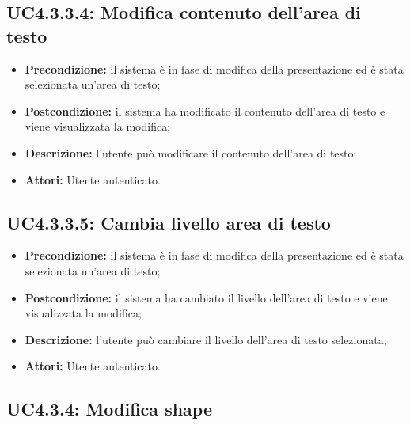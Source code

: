 \subsection{ UC4.3.3.4: Modifica contenuto dell'area di testo}

\begin{itemize}
	\item \textbf{Precondizione:} il sistema è in fase di modifica della presentazione ed è stata selezionata un'area di testo;
	\item \textbf{Postcondizione:} il sistema ha modificato il contenuto dell'area di testo e viene visualizzata la modifica;
	\item \textbf{Descrizione:} l'utente può modificare il contenuto dell'area di testo;
	\item \textbf{Attori:} Utente autenticato.
\end{itemize}
\subsection{ UC4.3.3.5: Cambia livello area di testo}

\begin{itemize}
	\item \textbf{Precondizione:} il sistema è in fase di modifica della presentazione ed è stata selezionata un'area di testo;
	\item \textbf{Postcondizione:} il sistema ha cambiato il livello dell'area di testo e viene visualizzata la modifica;
	\item \textbf{Descrizione:} l'utente può cambiare il livello dell'area di testo selezionata;
	\item \textbf{Attori:} Utente autenticato.
\end{itemize}
\subsection{ UC4.3.4: Modifica shape}

